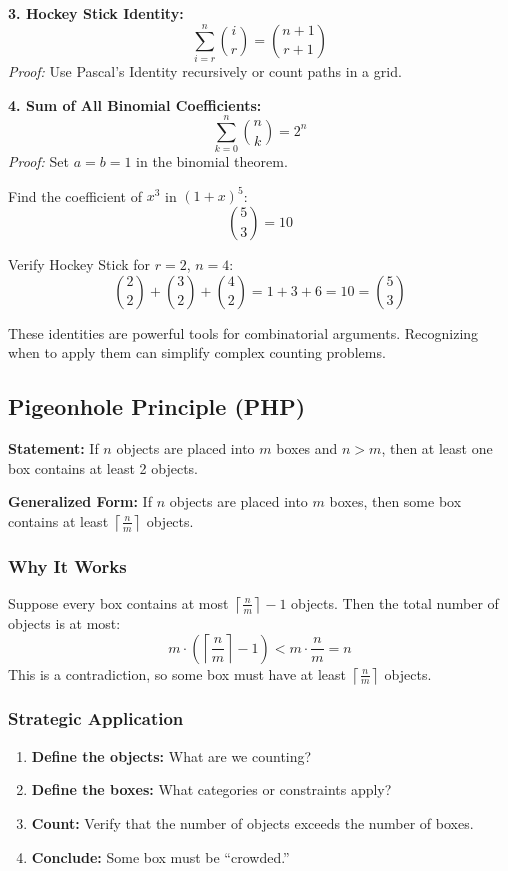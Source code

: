 \documentclass[12pt]{extarticle}
\begin{document}
\textbf{3. Hockey Stick Identity:}
\[
\sum_{i=r}^{n} \binom{i}{r} = \binom{n+1}{r+1}
\]
\textit{Proof:} Use Pascal's Identity recursively or count paths in a grid.

\textbf{4. Sum of All Binomial Coefficients:}
\[
\sum_{k=0}^{n} \binom{n}{k} = 2^n
\]
\textit{Proof:} Set $a = b = 1$ in the binomial theorem.

\begin{examplebox}
Find the coefficient of $x^3$ in $(1+x)^5$:
\[
\binom{5}{3} = 10
\]
\end{examplebox}

\begin{examplebox}
Verify Hockey Stick for $r=2$, $n=4$:
\[
\binom{2}{2} + \binom{3}{2} + \binom{4}{2} = 1 + 3 + 6 = 10 = \binom{5}{3}
\]
\end{examplebox}

\begin{remarkbox}
These identities are powerful tools for combinatorial arguments. Recognizing when to apply them can simplify complex counting problems.
\end{remarkbox}
\newpage
\subsection{Pigeonhole Principle (PHP)}

\textbf{Statement:} If $n$ objects are placed into $m$ boxes and $n > m$, then at least one box contains at least 2 objects.

\textbf{Generalized Form:} If $n$ objects are placed into $m$ boxes, then some box contains at least $\left\lceil \frac{n}{m} \right\rceil$ objects.

\subsubsection{Why It Works}

Suppose every box contains at most $\left\lceil \frac{n}{m} \right\rceil - 1$ objects. Then the total number of objects is at most:
\[
m \cdot \left( \left\lceil \frac{n}{m} \right\rceil - 1 \right) < m \cdot \frac{n}{m} = n
\]
This is a contradiction, so some box must have at least $\left\lceil \frac{n}{m} \right\rceil$ objects.

\subsubsection{Strategic Application}

\begin{enumerate}
    \item \textbf{Define the objects:} What are we counting?
    \item \textbf{Define the boxes:} What categories or constraints apply?
    \item \textbf{Count:} Verify that the number of objects exceeds the number of boxes.
    \item \textbf{Conclude:} Some box must be ``crowded.''
\end{enumerate}
\end{document}
